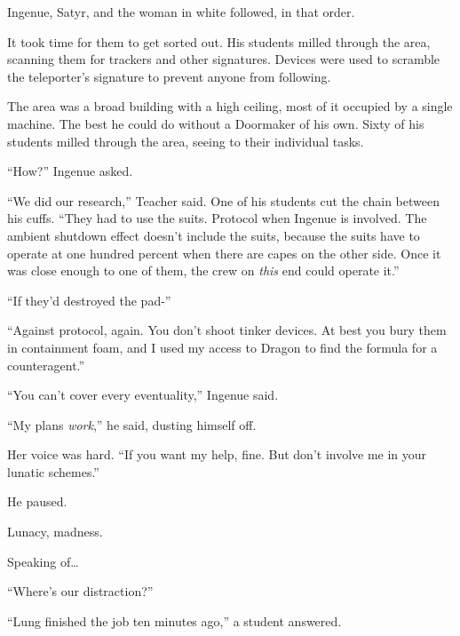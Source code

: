 Ingenue, Satyr, and the woman in white followed, in that order.



It took time for them to get sorted out.  His students milled through the area, scanning them for trackers and other signatures.  Devices were used to scramble the teleporter's signature to prevent anyone from following.



The area was a broad building with a high ceiling, most of it occupied by a single machine.  The best he could do without a Doormaker of his own.  Sixty of his students milled through the area, seeing to their individual tasks.



``How?'' Ingenue asked.



``We did our research,'' Teacher said.  One of his students cut the chain between his cuffs.  ``They had to use the suits.  Protocol when Ingenue is involved.  The ambient shutdown effect doesn't include the suits, because the suits have to operate at one hundred percent when there are capes on the other side.  Once it was close enough to one of them, the crew on \emph{this} end could operate it.''



``If they'd destroyed the pad-''



``Against protocol, again.  You don't shoot tinker devices.  At best you bury them in containment foam, and I used my access to Dragon to find the formula for a counteragent.''



``You can't cover every eventuality,'' Ingenue said.



``My plans \emph{work},'' he said, dusting himself off.



Her voice was hard.  ``If you want my help, fine.  But don't involve me in your lunatic schemes.''



He paused.



Lunacy, madness.



Speaking of\ldots



``Where's our distraction?''



``Lung finished the job ten minutes ago,'' a student answered.



